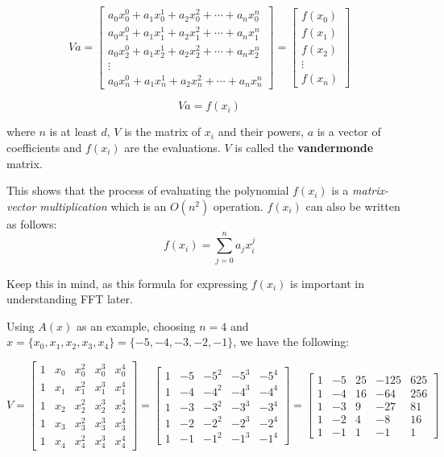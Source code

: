\documentclass[11pt]{article}
\begin{document}
\begin{enumerate}
  \[Va = \begin{bmatrix}a_0x_0^0 + a_1x_0^1 + a_2x_0^2 + \cdots + a_nx_0^n\\ a_0x_1^0 + a_1x_1^1 + a_2x_1^2 + \cdots + a_nx_1^n \\ a_0x_2^0 + a_1x_2^1 + a_2x_2^2 + \cdots + a_nx_2^n \\ \vdots \\ a_0x_n^0 + a_1x_n^1 + a_2x_n^2 + \cdots + a_nx_n^n \end{bmatrix} = \begin{bmatrix} f(x_0) \\ f(x_1) \\ f(x_2) \\ \vdots \\ f(x_n) \end{bmatrix}\]

  \[ Va = f(x_i)\]

  where \(n\) is at least \(d\), \(V\) is the matrix of \(x_i\) and
  their powers, \(a\) is a vector of coefficients and \(f(x_i)\) are the
  evaluations. \(V\) is called the \textbf{vandermonde} matrix.

  This shows that the process of evaluating the polynomial \(f(x_i)\) is
  a \emph{matrix-vector multiplication} which is an \(O(n^2)\)
  operation. \(f(x_i)\) can also be written as follows:
  \[f(x_i) = \sum^{n}_{j=0}a_jx^j_i\]

  Keep this in mind, as this formula for expressing \(f(x_i)\) is
  important in understanding FFT later.

  Using \(A(x)\) as an example, choosing \(n = 4\) and
  \(x =\{x_0, x_1, x_2, x_3, x_4\}= \{-5, -4, -3, -2, -1\}\), we have
  the following:

  \[V = \begin{bmatrix}1 & x_0 & x_0^2 & x_0^3 & x_0^4 \\1 & x_1 & x_1^2 & x_1^3 & x_1^4 \\1 & x_2 & x_2^2 & x_2^3 & x_2^4 \\1 & x_3 & x_3^2 & x_3^3 & x_3^4 \\1 & x_4 & x_4^2 & x_4^3 & x_4^4 \end{bmatrix} = \begin{bmatrix}1 & -5 & -5^2 & -5^3 & -5^4 \\ 1 & -4 & -4^2 & -4^3 & -4^4 \\ 1 & -3 & -3^2 & -3^3 & -3^4 \\ 1 & -2 & -2^2 & -2^3 & -2^4 \\ 1 & -1 & -1^2 & -1^3 & -1^4 \end{bmatrix} = \begin{bmatrix}1 & -5 & 25 & -125 & 625 \\1 & -4 & 16 & -64 & 256 \\1 & -3 & 9 & -27 & 81 \\1 & -2 & 4 & -8 & 16 \\1 & -1 & 1 & -1 & 1\end{bmatrix}\]


\end{enumerate}
\end{document}
